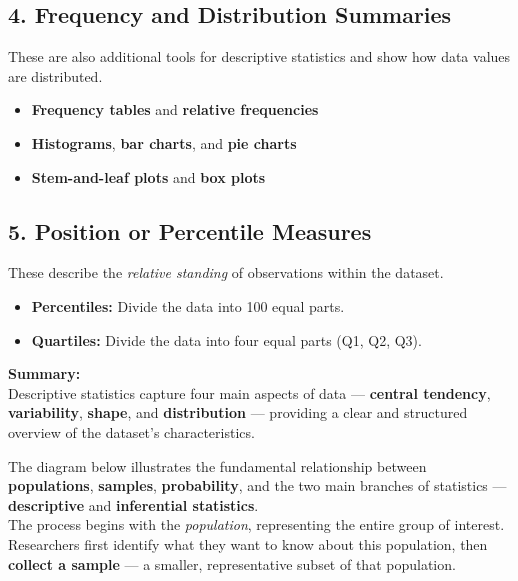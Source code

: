 \documentclass[
  letterpaper,
  DIV=11,
  numbers=noendperiod]{scrreprt}
\providecommand{\tightlist}{%
  \setlength{\itemsep}{0pt}\setlength{\parskip}{0pt}}
\begin{document}
\subsection{4. Frequency and Distribution
Summaries}\label{frequency-and-distribution-summaries}

These are also additional tools for descriptive statistics and show how
data values are distributed.

\begin{itemize}
\tightlist
\item
  \textbf{Frequency tables} and \textbf{relative frequencies}\\
\item
  \textbf{Histograms}, \textbf{bar charts}, and \textbf{pie charts}\\
\item
  \textbf{Stem-and-leaf plots} and \textbf{box plots}
\end{itemize}

\subsection{5. Position or Percentile
Measures}\label{position-or-percentile-measures}

These describe the \emph{relative standing} of observations within the
dataset.

\begin{itemize}
\tightlist
\item
  \textbf{Percentiles:} Divide the data into 100 equal parts.\\
\item
  \textbf{Quartiles:} Divide the data into four equal parts (Q1, Q2,
  Q3).
\end{itemize}

\textbf{Summary:}\\
Descriptive statistics capture four main aspects of data ---
\textbf{central tendency}, \textbf{variability}, \textbf{shape}, and
\textbf{distribution} --- providing a clear and structured overview of
the dataset's characteristics.

The diagram below illustrates the fundamental relationship between
\textbf{populations}, \textbf{samples}, \textbf{probability}, and the
two main branches of statistics --- \textbf{descriptive} and
\textbf{inferential statistics}.\\
The process begins with the \emph{population}, representing the entire
group of interest. Researchers first identify what they want to know
about this population, then \textbf{collect a sample} --- a smaller,
representative subset of that population.
\end{document}
